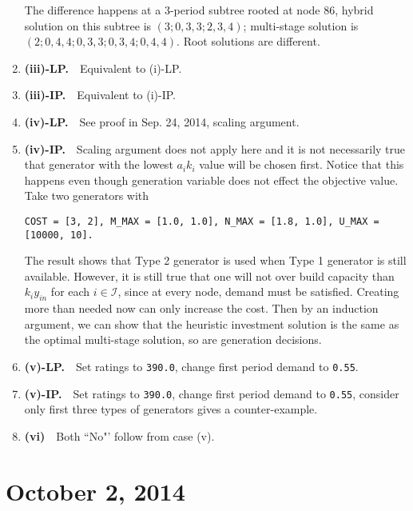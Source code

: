 \documentclass[10pt]{article}
\theoremstyle{plain}
\theoremstyle{definition}
\theoremstyle{remark}
\newcommand{\mcal}{\mathcal}
\begin{document}
\begin{enumerate}
The difference happens at a 3-period subtree rooted at node 86,
hybrid solution on this subtree is $(3;0,3,3;2,3,4)$; multi-stage solution is $(2;0,4,4;0,3,3;0,3,4;0,4,4)$.
Root solutions are different.
\item {\bf (iii)-LP.}~~Equivalent to (i)-LP.
\item {\bf (iii)-IP.}~~Equivalent to (i)-IP.
\item {\bf (iv)-LP.}~~See proof in Sep. 24, 2014, scaling argument.
\item {\bf (iv)-IP.}~~Scaling argument does not apply here and it is not necessarily true
that generator with the lowest $a_ik_i$ value will be chosen first.
Notice that this happens even though generation variable does not effect the objective value.
Take two generators with
\begin{verbatim}
COST = [3, 2], M_MAX = [1.0, 1.0], N_MAX = [1.8, 1.0], U_MAX = [10000, 10].
\end{verbatim}
The result shows that Type 2 generator is used when Type 1 generator is still available.
However, it is still true that one will not over build capacity than $k_iy_{in}$ for each $i\in \mcal{I}$,
since at every node, demand must be satisfied. Creating more than needed now can only
increase the cost. Then by an induction argument, we can show that the heuristic investment
solution is the same as the optimal multi-stage solution, so are generation decisions.
\item {\bf (v)-LP.}~~Set ratings to \texttt{390.0}, change first period demand to \texttt{0.55}.
\item {\bf (v)-IP.}~~Set ratings to \texttt{390.0}, change first period demand to \texttt{0.55},
consider only first three types of generators gives a counter-example.
\item {\bf (vi)}~~Both ``No"' follow from case (v).
\end{enumerate}


\section*{October 2, 2014}
\end{document}
